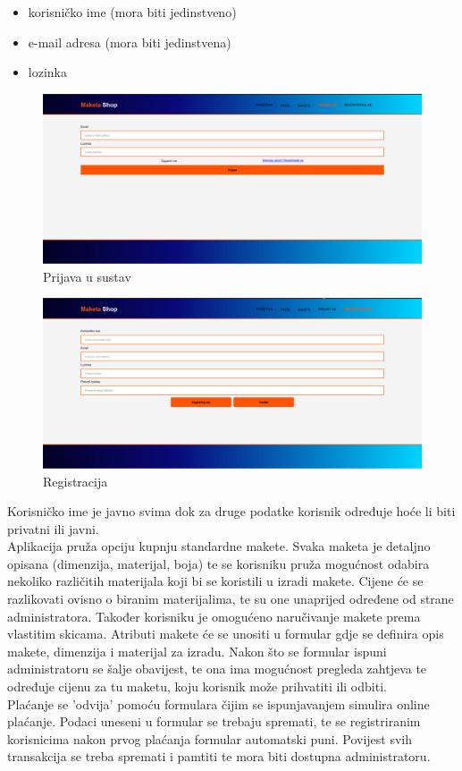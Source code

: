		\begin{itemize}
			\item korisničko ime (mora biti jedinstveno)
			\item e-mail adresa (mora biti jedinstvena)
			\item lozinka
		\end{itemize} 	
	
		\begin{figure}[H]
			\includegraphics[width=.9\linewidth]{slike/login.jpg}
			\centering
			\caption{Prijava u sustav}
			\label{fig:opis2}
		\end{figure}
	
		\begin{figure}[H]
			\includegraphics[width=.9\linewidth]{slike/registratura.jpg}
			\centering
			\caption{Registracija}
			\label{fig:opis3}
		\end{figure}
	
		Korisničko ime je javno svima dok za druge podatke korisnik određuje hoće li biti privatni ili javni.\\
		
		Aplikacija pruža opciju kupnju standardne makete. Svaka maketa je detaljno opisana (dimenzija, materijal, boja) te se korisniku pruža mogućnost odabira nekoliko različitih materijala koji bi se koristili u izradi makete. Cijene će se razlikovati ovisno o biranim materijalima, te su one unaprijed određene od strane administratora. Također korisniku je omogućeno naručivanje makete prema vlastitim skicama. Atributi makete će se unositi u formular gdje se definira opis makete, dimenzija i materijal za izradu. Nakon što se formular ispuni administratoru se šalje obavijest, te ona ima mogućnost pregleda zahtjeva te određuje cijenu za tu maketu, koju korisnik može prihvatiti ili odbiti. \\
		Plaćanje se 'odvija' pomoću formulara čijim se ispunjavanjem simulira online plaćanje. Podaci uneseni u formular se trebaju spremati, te se registriranim korisnicima nakon prvog plaćanja formular automatski puni. Povijest svih transakcija se treba spremati i pamtiti te mora biti dostupna administratoru. \\
		

